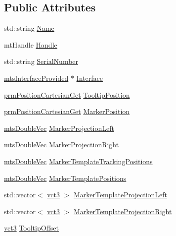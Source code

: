 \subsection*{Public Attributes}
\begin{DoxyCompactItemize}
\item 
std\+::string \hyperlink{classmts_micron_tracker_1_1_tool_a99366ed64e7a289aafe66e76b467614e}{Name}
\item 
mt\+Handle \hyperlink{classmts_micron_tracker_1_1_tool_ac1c53444059f0036ee818712b65cbff7}{Handle}
\item 
std\+::string \hyperlink{classmts_micron_tracker_1_1_tool_a474f21c01419e5afa938b1a6e0c27257}{Serial\+Number}
\item 
\hyperlink{classmts_interface_provided}{mts\+Interface\+Provided} $\ast$ \hyperlink{classmts_micron_tracker_1_1_tool_a883c18723a43e2096ccbaf852b3ee41c}{Interface}
\item 
\hyperlink{classprm_position_cartesian_get}{prm\+Position\+Cartesian\+Get} \hyperlink{classmts_micron_tracker_1_1_tool_a053af3e76832fc8cf0df4dc188e0ce8f}{Tooltip\+Position}
\item 
\hyperlink{classprm_position_cartesian_get}{prm\+Position\+Cartesian\+Get} \hyperlink{classmts_micron_tracker_1_1_tool_a2486620c5bf0ba342b737e5cccd4a154}{Marker\+Position}
\item 
\hyperlink{mts_vector_8h_af69167a5dc2ad33eb93965b9387d8403}{mts\+Double\+Vec} \hyperlink{classmts_micron_tracker_1_1_tool_a59cb72f20ac245239df66769dbbd9f00}{Marker\+Projection\+Left}
\item 
\hyperlink{mts_vector_8h_af69167a5dc2ad33eb93965b9387d8403}{mts\+Double\+Vec} \hyperlink{classmts_micron_tracker_1_1_tool_a217bdf4e30bcba4eff9e7c4b5cfd84cd}{Marker\+Projection\+Right}
\item 
\hyperlink{mts_vector_8h_af69167a5dc2ad33eb93965b9387d8403}{mts\+Double\+Vec} \hyperlink{classmts_micron_tracker_1_1_tool_ad134bdb9be08a36e4a6b27f495ca920c}{Marker\+Template\+Tracking\+Positions}
\item 
\hyperlink{mts_vector_8h_af69167a5dc2ad33eb93965b9387d8403}{mts\+Double\+Vec} \hyperlink{classmts_micron_tracker_1_1_tool_a1e2a36128f209ec70189e28502dbba67}{Marker\+Template\+Positions}
\item 
std\+::vector$<$ \hyperlink{vct_fixed_size_vector_types_8h_a3af82acdbf4eeb73c551909240b106ea}{vct3} $>$ \hyperlink{classmts_micron_tracker_1_1_tool_ad9b305c6ed8d81c2715cfdd7161ed146}{Marker\+Template\+Projection\+Left}
\item 
std\+::vector$<$ \hyperlink{vct_fixed_size_vector_types_8h_a3af82acdbf4eeb73c551909240b106ea}{vct3} $>$ \hyperlink{classmts_micron_tracker_1_1_tool_aa940a71dbf55cb85b2bf5681dd57c91e}{Marker\+Template\+Projection\+Right}
\item 
\hyperlink{vct_fixed_size_vector_types_8h_a3af82acdbf4eeb73c551909240b106ea}{vct3} \hyperlink{classmts_micron_tracker_1_1_tool_a661b9476c03d797ce5800bc887a35ceb}{Tooltip\+Offset}
\end{DoxyCompactItemize}


